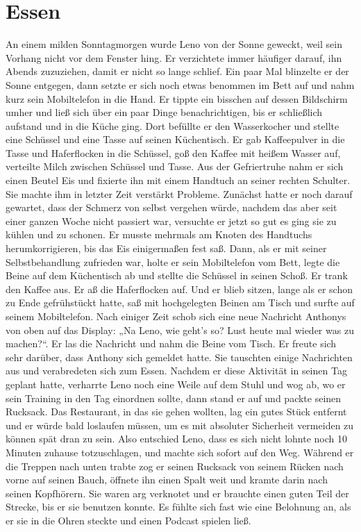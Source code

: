 \documentclass[ngerman,smalldemyvopaper,11pt,oneside,onecolumn,openright,extrafontsizes]{memoir}
\begin{document}
\chapter{Essen}
An einem milden Sonntagmorgen wurde Leno von der Sonne geweckt, weil sein Vorhang nicht vor dem Fenster hing. Er verzichtete immer häufiger darauf, ihn Abends zuzuziehen, damit er nicht so lange schlief. Ein paar Mal blinzelte er der Sonne entgegen, dann setzte er sich noch etwas benommen im Bett auf und nahm kurz sein Mobiltelefon in die Hand. Er tippte ein bisschen auf dessen Bildschirm umher und ließ sich über ein paar Dinge benachrichtigen, bis er schließlich aufstand und in die Küche ging. Dort befüllte er den Wasserkocher und stellte eine Schüssel und eine Tasse auf seinen Küchentisch. Er gab Kaffeepulver in die Tasse und Haferflocken in die Schüssel, goß den Kaffee mit heißem Wasser auf, verteilte Milch zwischen Schüssel und Tasse. Aus der Gefriertruhe nahm er sich einen Beutel Eis und fixierte ihn mit einem Handtuch an seiner rechten Schulter. Sie machte ihm in letzter Zeit verstärkt Probleme. Zunächst hatte er noch darauf gewartet, dass der Schmerz von selbst vergehen würde, nachdem das aber seit einer ganzen Woche nicht passiert war, versuchte er jetzt so gut es ging sie zu kühlen und zu schonen. Er musste mehrmals am Knoten des Handtuchs herumkorrigieren, bis das Eis einigermaßen fest saß. Dann, als er mit seiner Selbstbehandlung zufrieden war, holte er sein Mobiltelefon vom Bett, legte die Beine auf dem Küchentisch ab und stellte die Schüssel in seinen Schoß. Er trank den Kaffee aus. Er aß die Haferflocken auf. Und er blieb sitzen, lange als er schon zu Ende gefrühstückt hatte, saß mit hochgelegten Beinen am Tisch und surfte auf seinem Mobiltelefon. Nach einiger Zeit schob sich eine neue Nachricht Anthonys von oben auf das Display: „Na Leno, wie geht's so? Lust heute mal wieder was zu machen?“. Er las die Nachricht und nahm die Beine vom Tisch. Er freute sich sehr darüber, dass Anthony sich gemeldet hatte. Sie tauschten einige Nachrichten aus und verabredeten sich zum Essen. Nachdem er diese Aktivität in seinen Tag geplant hatte, verharrte Leno noch eine Weile auf dem Stuhl und wog ab, wo er sein Training in den Tag einordnen sollte, dann stand er auf und packte seinen Rucksack. Das Restaurant, in das sie gehen wollten, lag ein gutes Stück entfernt und er würde bald loslaufen müssen, um es mit absoluter Sicherheit vermeiden zu können spät dran zu sein. Also entschied Leno, dass es sich nicht lohnte noch 10 Minuten zuhause totzuschlagen, und machte sich sofort auf den Weg. Während er die Treppen nach unten trabte zog er seinen Rucksack von seinem Rücken nach vorne auf seinen Bauch, öffnete ihn einen Spalt weit und kramte darin nach seinen Kopfhörern. Sie waren arg verknotet und er brauchte einen guten Teil der Strecke, bis er sie benutzen konnte. Es fühlte sich fast wie eine Belohnung an, als er sie in die Ohren steckte und einen Podcast spielen ließ.
\end{document}
